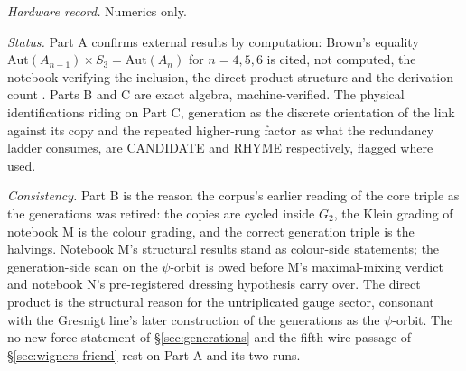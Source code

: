 \emph{Hardware record.} Numerics only.

\emph{Status.} Part A confirms external results by computation: Brown's equality
$\mathrm{Aut}(A_{n-1}) \times S_{3} = \mathrm{Aut}(A_{n})$ for $n = 4, 5, 6$ is cited, not
computed, the notebook verifying the inclusion, the direct-product structure and the derivation
count \autocite{brown1967generalized,eakinsathaye1990automorphisms,schafer1954cayleydickson}.
Parts B and C are exact algebra, machine-verified. The physical identifications riding on Part C,
generation as the discrete orientation of the link against its copy and the repeated higher-rung
factor as what the redundancy ladder consumes, are CANDIDATE and RHYME respectively, flagged
where used.

\emph{Consistency.} Part B is the reason the corpus's earlier reading of the core triple as the
generations was retired: the copies are cycled inside $G_{2}$, the Klein grading of notebook M is
the colour grading, and the correct generation triple is the halvings. Notebook M's structural
results stand as colour-side statements; the generation-side scan on the $\psi$-orbit is owed
before M's maximal-mixing verdict and notebook N's pre-registered dressing hypothesis carry over.
The direct product is the structural reason for the untriplicated gauge sector, consonant with
the Gresnigt line's later construction of the generations as the $\psi$-orbit. The no-new-force
statement of \S\ref{sec:generations} and the fifth-wire passage of \S\ref{sec:wigners-friend}
rest on Part A and its two runs.
